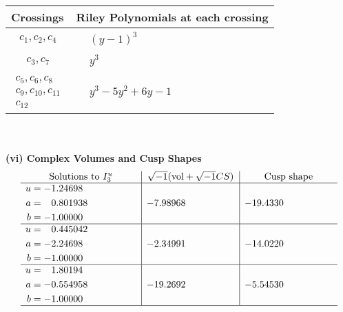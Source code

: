 \documentclass[1p]{elsarticle_modified}
\theoremstyle{definition}
\newcommand{\I}{\sqrt{-1}}
\begin{document}
\begin{tabular}{m{50pt}|m{274pt}}
Crossings & \hspace{64pt}Riley Polynomials at each crossing \\
\hline $$\begin{aligned}c_{1},c_{2},c_{4}\end{aligned}$$&$\begin{aligned}
&(y-1)^3
\end{aligned}$\\
\hline $$\begin{aligned}c_{3},c_{7}\end{aligned}$$&$\begin{aligned}
&y^3
\end{aligned}$\\
\hline $$\begin{aligned}c_{5},c_{6},c_{8}\\c_{9},c_{10},c_{11}\\c_{12}\end{aligned}$$&$\begin{aligned}
&y^3-5 y^2+6 y-1
\end{aligned}$\\
\hline
\end{tabular}\\~\\
\newpage\flushleft \textbf{(vi) Complex Volumes and Cusp Shapes}
$$\begin{array}{c|c|c}  
\text{Solutions to }I^u_{3}& \I (\text{vol} + \sqrt{-1}CS) & \text{Cusp shape}\\
 \hline 
\begin{aligned}
u &= -1.24698\phantom{ +0.000000I} \\
a &= \phantom{-}0.801938\phantom{ +0.000000I} \\
b &= -1.00000\phantom{ +0.000000I}\end{aligned}
 & -7.98968\phantom{ +0.000000I} & -19.4330\phantom{ +0.000000I} \\ \hline\begin{aligned}
u &= \phantom{-}0.445042\phantom{ +0.000000I} \\
a &= -2.24698\phantom{ +0.000000I} \\
b &= -1.00000\phantom{ +0.000000I}\end{aligned}
 & -2.34991\phantom{ +0.000000I} & -14.0220\phantom{ +0.000000I} \\ \hline\begin{aligned}
u &= \phantom{-}1.80194\phantom{ +0.000000I} \\
a &= -0.554958\phantom{ +0.000000I} \\
b &= -1.00000\phantom{ +0.000000I}\end{aligned}
 & -19.2692\phantom{ +0.000000I} & -5.54530\phantom{ +0.000000I}\\
 \hline 
 \end{array}$$\newpage\newpage\renewcommand{\arraystretch}{1}
\end{document}
